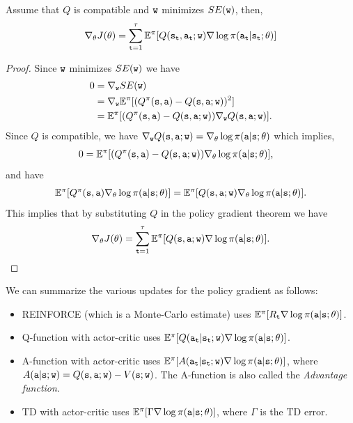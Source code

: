 \begin{theorem}
Assume that $Q$ is compatible and ${\tt w}$ minimizes $SE({\tt w})$,
then,
\[
\nabla_\theta J(\theta)=\sum_{{\tt t}=1}^\tau \mathbb{E}^\pi[Q({\tt s}_{\tt t},{\tt a}_{\tt t};{\tt w})
\nabla \log \pi({\tt a}_{\tt t}|{\tt s}_{\tt t};\theta)]
\]
\end{theorem}

\begin{proof}
Since ${\tt w}$ minimizes $SE({\tt w})$ we have
\begin{align*}
0 & = \nabla_{\tt w} SE({\tt w})\\
&= \nabla_{\tt w} \mathbb{E}^\pi[(Q^\pi({\tt s},{\tt a})-Q({\tt s},{\tt a};{\tt w}))^2]\\
&=
\mathbb{E}^\pi[(Q^\pi({\tt s},{\tt a})-Q({\tt s},{\tt a};{\tt w}))\nabla_{\tt w}
Q({\tt s},{\tt a};{\tt w})].
\end{align*}
Since $Q$ is compatible, we have $\nabla_{\tt w}
Q({\tt s},{\tt a};{\tt w})= \nabla_\theta \log
\pi({\tt a}|{\tt s};\theta)$ which implies,
\begin{align*}
0&=
\mathbb{E}^\pi[(Q^\pi({\tt s},{\tt a})-Q({\tt s},{\tt a};{\tt w}))\nabla_\theta
\log \pi({\tt a}|{\tt s};\theta)],
\end{align*}
and have
\begin{align*}
\mathbb{E}^\pi[Q^\pi({\tt s},{\tt a})\nabla_\theta \log \pi({\tt a}|{\tt s};\theta)] = \mathbb{E}^\pi[Q({\tt s},{\tt a};{\tt w})\nabla_\theta \log \pi({\tt a}|{\tt s};\theta)].
\end{align*}
This implies that by substituting $Q$ in the policy gradient theorem
we have
\[
\nabla_\theta J(\theta) = \sum_{{\tt t}=1}^\tau \mathbb{E}^\pi[Q({\tt s},{\tt a};{\tt w})
\nabla \log \pi({\tt a}|{\tt s};\theta)].
\]
\end{proof}

We can summarize the various updates for the policy gradient as
follows:
\begin{itemize}
\item REINFORCE (which is a Monte-Carlo estimate) uses
$\mathbb{E}^\pi[R_{\tt t} \nabla\log\pi({\tt a}|{\tt s};\theta) ]$.
\item Q-function with actor-critic uses
$\mathbb{E}^\pi[Q({\tt a}_{\tt t}|{\tt s}_{\tt t};{\tt w})
\nabla\log\pi({\tt a}|{\tt s};\theta) ]$.
\item A-function with actor-critic uses
$\mathbb{E}^\pi[A({\tt a}_{\tt t}|{\tt s}_{\tt t};{\tt w})
\nabla\log\pi({\tt a}|{\tt s};\theta) ]$, where
$A({\tt a}|{\tt s};{\tt w})=Q({\tt s},{\tt a};{\tt w})-V({\tt s};{\tt w})$. The A-function is also called the \emph{Advantage function}.
\item TD with actor-critic uses
$\mathbb{E}^\pi[\Gamma\nabla\log\pi({\tt a}|{\tt s};\theta) ]$, where
$\Gamma$ is the TD error.
\end{itemize}

